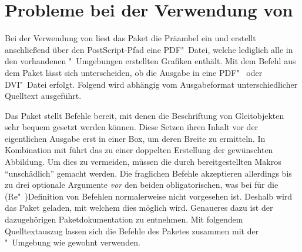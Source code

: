 \section{%
  Probleme bei der Verwendung von %
  \label{sec:tips:auto-pst-pdf}%
}
%
%
Bei der Verwendung von  liest das Paket  
die Präambel ein und erstellt anschließend über den PostScript-Pfad 
 eine PDF"~Datei, welche lediglich alle in den 
vorhandenen "~Umgebungen erstellten Grafiken enthält. 
Mit dem Befehl  aus dem Paket  lässt sich 
unterscheiden, ob die Ausgabe in eine PDF"~ oder DVI"~Datei erfolgt. Folgend 
wird abhängig vom Ausgabeformat unterschiedlicher Quelltext ausgeführt.
%
\begin{quoting}
\begin{Code}
\usepackage{iftex}
\end{Code}
\end{quoting}

%
Das Paket  stellt Befehle bereit, mit denen die Beschriftung 
von Gleitobjekten sehr bequem gesetzt werden können. Diese Setzen ihren Inhalt 
vor der eigentlichen Ausgabe erst in einer Box, um deren Breite zu ermitteln. 
In Kombination mit  führt das zu einer doppelten 
Erstellung der gewünschten Abbildung. Um dies zu vermeiden, müssen die durch 
 bereitgestellten Makros \enquote{unschädlich} gemacht 
werden. Die fraglichen Befehle akzeptieren allerdings bis zu drei optionale 
Argumente \emph{vor} den beiden obligatorischen, was bei  für die 
(Re"~)Definition von Befehlen normalerweise nicht vorgesehen ist. Deshalb wird 
das Paket  geladen, mit welchem dies möglich wird. Genaueres 
dazu ist der dazugehörigen Paketdokumentation zu entnehmen. Mit folgendem 
Quelltextauszug lassen sich die Befehle des Paketes  zusammen 
mit der "~Umgebung wie gewohnt verwenden.
%
\begin{quoting}
\begin{Code}
\usepackage{floatrow}
\usepackage{xparse}
\ifpdf\else
\fi
\end{Code}
\end{quoting}

